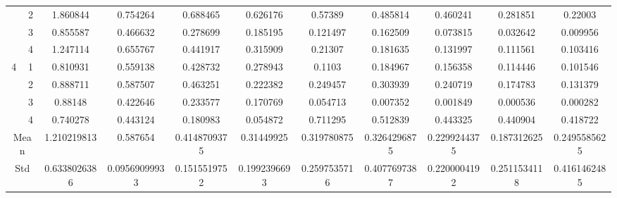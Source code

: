 \documentclass[draft,dvipsnames]{drexel-thesis}
\begin{document}
\begin{thesis}
\begin{table}[!t]
{\begin{tabular}{|c|c|c|c|c|c|c|c|c|c|c|}
                      & 2                   & 1.860844     & 0.754264      & 0.688465     & 0.626176     & 0.57389      & 0.485814     & 0.460241     & 0.281851     & 0.22003      \\ \cline{2-11} 
                      & 3                   & 0.855587     & 0.466632      & 0.278699     & 0.185195     & 0.121497     & 0.162509     & 0.073815     & 0.032642     & 0.009956     \\ \cline{2-11} 
                      & 4                   & 1.247114     & 0.655767      & 0.441917     & 0.315909     & 0.21307      & 0.181635     & 0.131997     & 0.111561     & 0.103416     \\ \hline
\multirow{4}{*}{4}    & 1                   & 0.810931     & 0.559138      & 0.428732     & 0.278943     & 0.1103       & 0.184967     & 0.156358     & 0.114446     & 0.101546     \\ \cline{2-11} 
                      & 2                   & 0.888711     & 0.587507      & 0.463251     & 0.222382     & 0.249457     & 0.303939     & 0.240719     & 0.174783     & 0.131379     \\ \cline{2-11} 
                      & 3                   & 0.88148      & 0.422646      & 0.233577     & 0.170769     & 0.054713     & 0.007352     & 0.001849     & 0.000536     & 0.000282     \\ \cline{2-11} 
                      & 4                   & 0.740278     & 0.443124      & 0.180983     & 0.054872     & 0.711295     & 0.512839     & 0.443325     & 0.440904     & 0.418722     \\ \hline
\multicolumn{2}{|c|}{Mean}                  & 1.210219813  & 0.587654      & 0.4148709375 & 0.31449925   & 0.319780875  & 0.3264296875 & 0.2299244375 & 0.187312625  & 0.2495585625 \\ \hline
\multicolumn{2}{|c|}{Std}                   & 0.6338026386 & 0.09569099933 & 0.1515519752 & 0.1992396693 & 0.2597535716 & 0.4077697387 & 0.2200004192 & 0.2511534118 & 0.4161462485 \\ \hline
\end{tabular}}
\end{table}


\end{thesis}
\end{document}
